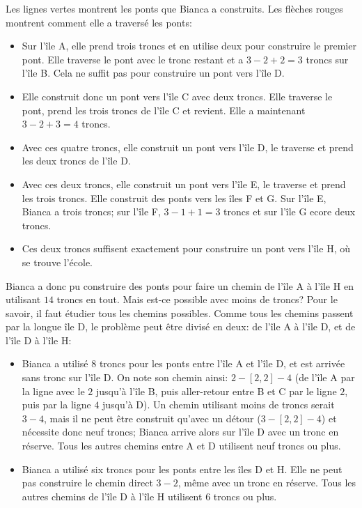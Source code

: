 {{{\centering%
\par}

Les lignes vertes montrent les ponts que Bianca a construits. Les flèches rouges montrent comment elle a traversé les ponts:

\begin{itemize}
  \item Sur l’île A, elle prend trois troncs et en utilise deux pour construire le premier pont. Elle traverse le pont avec le tronc restant et a ${3 - 2 + 2 = 3}$ troncs sur l’île B. Cela ne suffit pas pour construire un pont vers l’île D.
  \item Elle construit donc un pont vers l’île C avec deux troncs. Elle traverse le pont, prend les trois troncs de l’île C et revient. Elle a maintenant ${3 - 2 + 3 = 4}$ troncs.
  \item Avec ces quatre troncs, elle construit un pont vers l’île D, le traverse et prend les deux troncs de l’île D.
  \item Avec ces deux troncs, elle construit un pont vers l’île E, le traverse et prend les trois troncs. Elle construit des ponts vers les îles F et G. Sur l’île E, Bianca a trois troncs; sur l’île F, ${3 - 1 + 1 = 3}$ troncs et sur l’île G ecore deux troncs.
  \item Ces deux troncs suffisent exactement pour construire un pont vers l’île H, où se trouve l’école.
\end{itemize}

Bianca a donc pu construire des ponts pour faire un chemin de l’île A à l’île H en utilisant $14$ troncs en tout. Mais est-ce possible avec moins de troncs? Pour le savoir, il faut étudier tous les chemins possibles. Comme tous les chemins passent par la longue île D, le problème peut être divisé en deux: de l’île A à l’île D, et de l’île D à l’île H:

\begin{itemize}
  \item Bianca a utilisé $8$ troncs pour les ponts entre l’île A et l’île D, et est arrivée sans tronc sur l’île D. On note son chemin ainsi: ${2-[2,2]-4}$ (de l’île A par la ligne avec le $2$ jusqu’à l’île B, puis aller-retour entre B et C par le ligne $2$, puis par la ligne $4$ jusqu’à D). Un chemin utilisant moins de troncs serait ${3-4}$, mais il ne peut être construit qu’avec un détour (${3-[2,2]-4}$) et nécessite donc neuf troncs; Bianca arrive alors sur l’île D avec un tronc en réserve. Tous les autres chemins entre A et D utilisent neuf troncs ou plus.
  \item Bianca a utilisé six troncs pour les ponts entre les îles D et H. Elle ne peut pas construire le chemin direct ${3-2}$, même avec un tronc en réserve. Tous les autres chemins de l’île D à l’île H utilisent $6$ troncs ou plus.
\end{itemize}

}}
